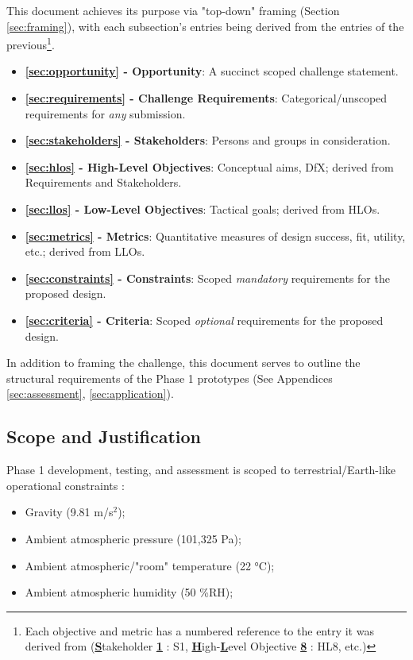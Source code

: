 \documentclass{report}
\begin{document}
This document achieves its purpose via "top-down" framing (Section \ref{sec:framing}), with each subsection's 
entries being derived from the entries of the previous\footnote{Each objective and metric has 
a numbered reference to the entry it was derived from (\uline{\textbf{S}}takeholder 
\uline{\textbf{1}} : S1, \uline{\textbf{H}}igh-\uline{\textbf{L}}evel Objective 
\uline{\textbf{8}} : HL8, etc.)}.

\begin{itemize}
    \item \textbf{\ref{sec:opportunity} - Opportunity}: A succinct scoped challenge 
    statement.
    \item \textbf{\ref{sec:requirements} - Challenge Requirements}: Categorical/unscoped 
    requirements for \textit{any} submission.
    \item \textbf{\ref{sec:stakeholders} - Stakeholders}: Persons and groups in 
    consideration.
    \item \textbf{\ref{sec:hlos} - High-Level Objectives}: Conceptual aims, DfX; derived 
    from Requirements and Stakeholders.
    \item \textbf{\ref{sec:llos} - Low-Level Objectives}: Tactical goals; derived from HLOs.
    \item \textbf{\ref{sec:metrics} - Metrics}: Quantitative measures of design success, fit, 
    utility, etc.; derived from LLOs.
    \item \textbf{\ref{sec:constraints} - Constraints}: Scoped \textit{mandatory} requirements for 
    the proposed design.
    \item \textbf{\ref{sec:criteria} - Criteria}: Scoped \textit{optional} requirements for 
    the proposed design.
\end{itemize}

In addition to framing the challenge, this document serves to outline the structural requirements 
of the Phase 1 prototypes (See Appendices \ref{sec:assessment}, \ref{sec:application}).

\newpage

\subsection{Scope and Justification}
\label{sec:scope}

Phase 1 development, testing, and assessment is scoped to terrestrial/Earth-like operational constraints \cite{applicantguide}:
\begin{itemize}
    \item Gravity (9.81 m/s${}^2$);
    \item Ambient atmospheric pressure (101,325 Pa);
    \item Ambient atmospheric/"room" temperature (22 °C);
    \item Ambient atmospheric humidity (50 \%RH);
\end{itemize}
\end{document}
